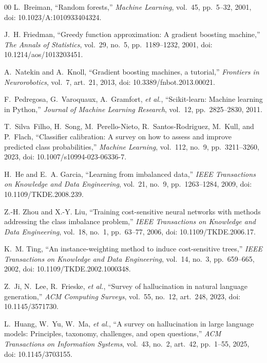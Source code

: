 \documentclass[lettersize,journal]{IEEEtran}
\begin{document}
\begin{thebibliography}{00}
L.~Breiman, ``Random forests,'' \emph{Machine Learning}, vol.~45, pp.~5--32,
2001, doi: 10.1023/A:1010933404324.

J.~H. Friedman, ``Greedy function approximation: A gradient boosting machine,''
\emph{The Annals of Statistics}, vol.~29, no.~5, pp.~1189--1232, 2001, doi:
10.1214/aos/1013203451.

A.~Natekin and A.~Knoll, ``Gradient boosting machines, a tutorial,''
\emph{Frontiers in Neurorobotics}, vol.~7, art.~21, 2013, doi:
10.3389/fnbot.2013.00021.

F.~Pedregosa, G.~Varoquaux, A.~Gramfort, \emph{et al.}, ``Scikit-learn: Machine
learning in Python,'' \emph{Journal of Machine Learning Research}, vol.~12,
pp.~2825--2830, 2011.

T.~Silva~Filho, H.~Song, M.~Perello-Nieto, R.~Santos-Rodriguez, M.~Kull, and
P.~Flach, ``Classifier calibration: A survey on how to assess and improve
predicted class probabilities,'' \emph{Machine Learning}, vol.~112, no.~9,
pp.~3211--3260, 2023, doi: 10.1007/s10994-023-06336-7.

H.~He and E.~A. Garcia, ``Learning from imbalanced data,'' \emph{IEEE
Transactions on Knowledge and Data Engineering}, vol.~21, no.~9,
pp.~1263--1284, 2009, doi: 10.1109/TKDE.2008.239.

Z.-H. Zhou and X.-Y. Liu, ``Training cost-sensitive neural networks with
methods addressing the class imbalance problem,'' \emph{IEEE Transactions on
Knowledge and Data Engineering}, vol.~18, no.~1, pp.~63--77, 2006, doi:
10.1109/TKDE.2006.17.

K.~M. Ting, ``An instance-weighting method to induce cost-sensitive trees,''
\emph{IEEE Transactions on Knowledge and Data Engineering}, vol.~14, no.~3,
pp.~659--665, 2002, doi: 10.1109/TKDE.2002.1000348.

Z.~Ji, N.~Lee, R.~Frieske, \emph{et al.}, ``Survey of hallucination in natural
language generation,'' \emph{ACM Computing Surveys}, vol.~55, no.~12, art.~248,
2023, doi: 10.1145/3571730.

L.~Huang, W.~Yu, W.~Ma, \emph{et al.}, ``A survey on hallucination in large
language models: Principles, taxonomy, challenges, and open questions,''
\emph{ACM Transactions on Information Systems}, vol.~43, no.~2, art.~42,
pp.~1--55, 2025, doi: 10.1145/3703155.


\end{thebibliography}
\end{document}
